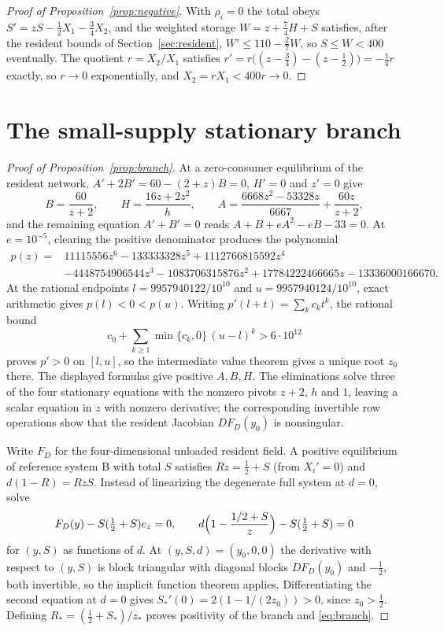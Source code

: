\documentclass[11pt,a4paper]{article}
\theoremstyle{plain}
\theoremstyle{definition}
\theoremstyle{remark}
\begin{document}
\begin{proof}[Proof of Proposition~\ref{prop:negative}]
With $\rho_i=0$ the total obeys $S'=zS-\tfrac12X_1-\tfrac34X_2$, and the weighted storage $W=z+\tfrac74H+S$ satisfies, after the resident bounds of Section~\ref{sec:resident}, $W'\le110-\tfrac27W$, so $S\le W<400$ eventually. The quotient $r=X_2/X_1$ satisfies $r'=r\bigl((z-\tfrac34)-(z-\tfrac12)\bigr)=-\tfrac14r$ exactly, so $r\to0$ exponentially, and $X_2=rX_1<400r\to0$.
\end{proof}

\section{The small-supply stationary branch}\label{sec:branch}
\begin{proof}[Proof of Proposition~\ref{prop:branch}]
At a zero-consumer equilibrium of the resident network, $A'+2B'=60-(2+z)B=0$, $H'=0$ and $z'=0$ give
\[
B=\frac{60}{z+2},\qquad H=\frac{16z+2z^2}h,\qquad
A=\frac{6668z^2-53328z}{6667}+\frac{60z}{z+2},
\]
and the remaining equation $A'+B'=0$ reads $A+B+eA^2-eB-33=0$. At $e=10^{-5}$, clearing the positive denominator produces the polynomial
\begin{align*}
p(z)={}&11115556z^6-133333328z^5+1112766815592z^4\\
&-4448754906544z^3-1083706315876z^2+17784222466665z-13336000166670 .
\end{align*}
At the rational endpoints $l=9957940122/10^{10}$ and $u=9957940124/10^{10}$, exact arithmetic gives $p(l)<0<p(u)$. Writing $p'(l+t)=\sum_kc_kt^k$, the rational bound
\[
c_0+\sum_{k\ge1}\min\{c_k,0\}\,(u-l)^k>6\cdot10^{12}
\]
proves $p'>0$ on $[l,u]$, so the intermediate value theorem gives a unique root $z_0$ there. The displayed formulas give positive $A,B,H$. The eliminations solve three of the four stationary equations with the nonzero pivots $z+2$, $h$ and $1$, leaving a scalar equation in $z$ with nonzero derivative; the corresponding invertible row operations show that the resident Jacobian $DF_D(y_0)$ is nonsingular.

Write $F_D$ for the four-dimensional unloaded resident field. A positive equilibrium of reference system B with total $S$ satisfies $Rz=\tfrac12+S$ (from $X_i'=0$) and $d(1-R)=RzS$. Instead of linearizing the degenerate full system at $d=0$, solve
\begin{equation}\label{eq:IFT}
F_D(y)-S(\tfrac12+S)e_z=0,\qquad
d\Bigl(1-\frac{1/2+S}z\Bigr)-S(\tfrac12+S)=0
\end{equation}
for $(y,S)$ as functions of $d$. At $(y,S,d)=(y_0,0,0)$ the derivative with respect to $(y,S)$ is block triangular with diagonal blocks $DF_D(y_0)$ and $-\tfrac12$, both invertible, so the implicit function theorem applies. Differentiating the second equation at $d=0$ gives $S_*'(0)=2(1-1/(2z_0))>0$, since $z_0>\tfrac12$. Defining $R_*=(\tfrac12+S_*)/z_*$ proves positivity of the branch and \eqref{eq:branch}.
\end{proof}
\end{document}
